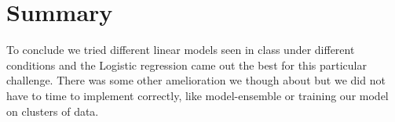 \documentclass[10pt,conference,compsocconf]{IEEEtran}
\begin{document}
\section{Summary}

To conclude we tried different linear models seen in class under different conditions and the Logistic regression came out the best for this particular challenge. There was some other amelioration we though about but we did not have to time to implement correctly, like model-ensemble or training our model on clusters of data.

\newpage


\end{document}
